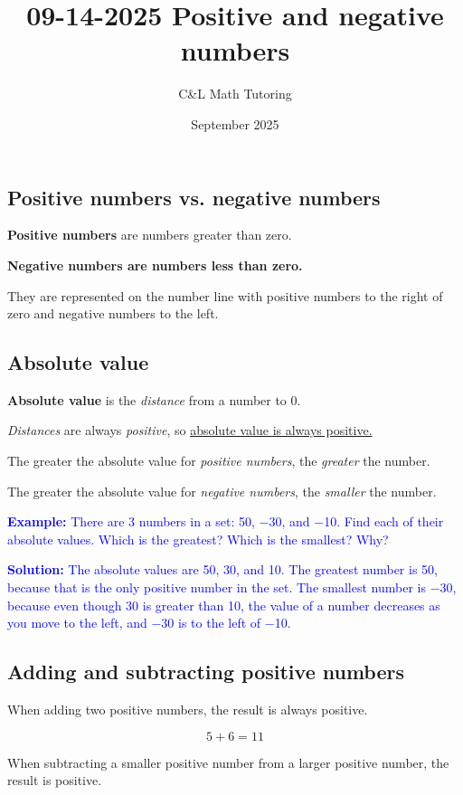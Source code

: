 \documentclass[a4paper, 12pt]{article}
\title{09-14-2025 Positive and negative numbers}
\author{C\&L Math Tutoring}
\date{September 2025}
\begin{document}
\maketitle

\subsection*{Positive numbers vs. negative numbers}

\textbf{Positive numbers} are numbers greater than zero.

\textbf{Negative numbers are numbers less than zero.}

They are represented on the number line with positive numbers to the right of zero and negative numbers to the left.

\subsection*{Absolute value}

\textbf{Absolute value} is the \textit{distance} from a number to 0.

\textit{Distances} are always \textit{positive}, so \underline{absolute value is always positive.}

The greater the absolute value for \textit{positive numbers}, the \textit{greater} the number.

The greater the absolute value for \textit{negative numbers}, the \textit{smaller} the number.

\textcolor{blue}{\textbf{Example:} There are 3 numbers in a set: 50, $-$30, and $-$10. Find each of their absolute values. Which is the greatest? Which is the smallest? Why?}

\textcolor{blue}{\textbf{Solution:} The absolute values are 50, 30, and 10. The greatest number is 50, because that is the only positive number in the set. The smallest number is $-$30, because even though 30 is greater than 10, the value of a number decreases as you move to the left, and $-$30 is to the left of $-$10.}

\subsection*{Adding and subtracting positive numbers}

When adding two positive numbers, the result is always positive.

$$ 5 + 6 = 11 $$

When subtracting a smaller positive number from a larger positive number, the result is positive.
\end{document}
